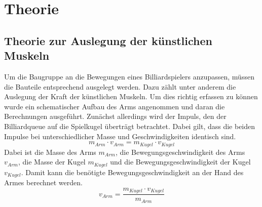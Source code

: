 \chapter{Theorie}
	\section{Theorie zur Auslegung der künstlichen Muskeln}
		Um die Baugruppe an die Bewegungen eines Billiardspielers anzupassen, müssen die Bauteile entsprechend ausgelegt werden. 
		Dazu zählt unter anderem die Auslegung der Kraft der künstlichen Muskeln. 
		Um dies richtig erfassen zu können wurde ein schematischer Aufbau des Arms angenommen und daran die Berechnungen ausgeführt. 
		Zunächst allerdings wird der Impuls, den der Billiardqueue auf die Spielkugel überträgt betrachtet. 
		Dabei gilt, dass die beiden Impulse bei unterschiedlicher Masse und Geschwindigkeiten identisch sind. 
		\begin{equation}
			m_{Arm} \cdot v_{Arm} = m_{Kugel} \cdot v_{Kugel}%
			\label{eq:ImpulsKugel}
		\end{equation}
		Dabei ist die Masse des Arms \(m_{Arm}\), die Bewegungsgeschwindigkeit des Arms \(v_{Arm}\), die Masse der Kugel \(m_{Kugel}\) und die Bewegungsgeschwindigkeit der Kugel \(v_{Kugel}\).
		Damit kann die benötigte Bewegungsgeschwindigkeit an der Hand des Armes berechnet werden.
		\begin{equation}
			v_{Arm} = \frac{m_{Kugel} \cdot v_{Kugel}}{m_{Arm}}%
			\label{eq:SollgeschwindikeitArm}
		\end{equation}


